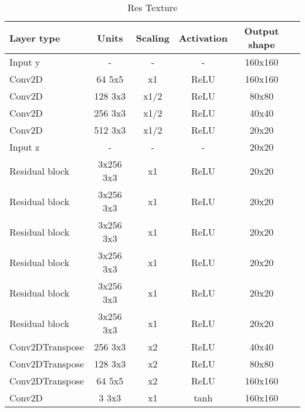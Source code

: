 \begin{table*}[!h]
	\centering
	\begin{tabular}{|l|c|c|c|c|c|}
		\hline
		Layer type & Units & Scaling & Activation & Output shape\\
		\hline
		Input y & - & - & - & 160x160\\
		Conv2D & 64 5x5 & x1 & ReLU & 160x160 \\
		Conv2D & 128 3x3 & x1/2 & ReLU & 80x80 \\
		Conv2D & 256 3x3 & x1/2 & ReLU & 40x40 \\
		Conv2D & 512 3x3 & x1/2 & ReLU & 20x20 \\
		Input z & - & - & - & 20x20 \\
		Residual block & 3x256 3x3 & x1 & ReLU & 20x20 \\
		Residual block & 3x256 3x3 & x1 & ReLU & 20x20 \\
		Residual block & 3x256 3x3 & x1 & ReLU & 20x20 \\
		Residual block & 3x256 3x3 & x1 & ReLU & 20x20 \\
		Residual block & 3x256 3x3 & x1 & ReLU & 20x20 \\
		Residual block & 3x256 3x3 & x1 & ReLU & 20x20 \\
		Conv2DTranspose & 256 3x3 & x2 & ReLU & 40x40 \\
		Conv2DTranspose & 128 3x3 & x2 & ReLU & 80x80 \\
		Conv2DTranspose & 64 5x5 & x2 & ReLU & 160x160 \\
		Conv2D & 3 3x3 & x1 & tanh & 160x160 \\
		\hline
	\end{tabular}
	\caption{Res Texture}
\end{table*}



